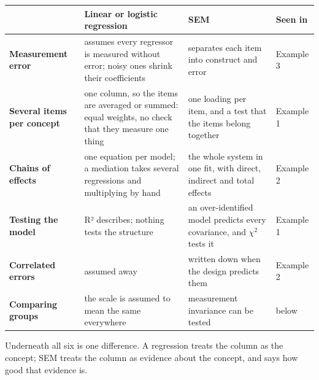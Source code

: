 \documentclass[
  letterpaper,
  10pt,
  twoside,
  openright,
  numbers=noenddot,
  chapterprefix=true]{scrbook}
\begin{document}
\begin{longtable}[]{@{}
  >{\raggedright\arraybackslash}p{}
  >{\raggedright\arraybackslash}p{}
  >{\raggedright\arraybackslash}p{}
  >{\raggedright\arraybackslash}p{}@{}}
\toprule\noalign{}
\begin{minipage}[b]{\linewidth}\raggedright
\end{minipage} & \begin{minipage}[b]{\linewidth}\raggedright
Linear or logistic regression
\end{minipage} & \begin{minipage}[b]{\linewidth}\raggedright
SEM
\end{minipage} & \begin{minipage}[b]{\linewidth}\raggedright
Seen in
\end{minipage} \\
\midrule\noalign{}
\endhead
\bottomrule\noalign{}
\endlastfoot
\textbf{Measurement error} & assumes every regressor is measured without
error; noisy ones shrink their coefficients & separates each item into
construct and error & Example 3 \\
\textbf{Several items per concept} & one column, so the items are
averaged or summed: equal weights, no check that they measure one thing
& one loading per item, and a test that the items belong together &
Example 1 \\
\textbf{Chains of effects} & one equation per model; a mediation takes
several regressions and multiplying by hand & the whole system in one
fit, with direct, indirect and total effects & Example 2 \\
\textbf{Testing the model} & R² describes; nothing tests the structure &
an over-identified model predicts every covariance, and \(\chi^2\) tests
it & Example 1 \\
\textbf{Correlated errors} & assumed away & written down when the design
predicts them & Example 2 \\
\textbf{Comparing groups} & the scale is assumed to mean the same
everywhere & measurement invariance can be tested & below \\
\end{longtable}

Underneath all six is one difference. A regression treats the column as
the concept; SEM treats the column as evidence about the concept, and
says how good that evidence is.
\end{document}
